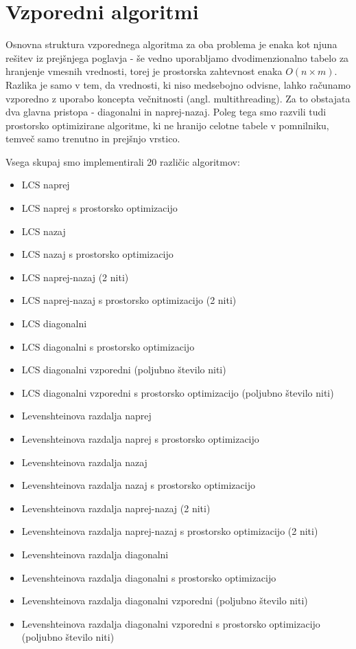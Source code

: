 \documentclass[a4paper,12pt,openright]{book}
\begin{document}
\chapter{Vzporedni algoritmi}

Osnovna struktura vzporednega algoritma za oba problema je enaka kot njuna rešitev iz prejšnjega poglavja - še vedno uporabljamo dvodimenzionalno tabelo za hranjenje vmesnih vrednosti, torej je prostorska zahtevnost enaka $O(n \times m)$. Razlika je samo v tem, da vrednosti, ki niso medsebojno odvisne, lahko računamo vzporedno z uporabo koncepta večnitnosti (angl. multithreading). Za to obstajata dva glavna pristopa - diagonalni in naprej-nazaj. Poleg tega smo razvili tudi prostorsko optimizirane algoritme, ki ne hranijo celotne tabele v pomnilniku, temveč samo trenutno in prejšnjo vrstico. 

Vsega skupaj smo implementirali 20 različic algoritmov:
\begin{itemize}
  \item LCS naprej 
  \item LCS naprej s prostorsko optimizacijo
  \item LCS nazaj 
  \item LCS nazaj s prostorsko optimizacijo
  \item LCS naprej-nazaj (2 niti)
  \item LCS naprej-nazaj s prostorsko optimizacijo (2 niti)
  \item LCS diagonalni
  \item LCS diagonalni s prostorsko optimizacijo
  \item LCS diagonalni vzporedni (poljubno število niti)
  \item LCS diagonalni vzporedni s prostorsko optimizacijo (poljubno število niti)
  \item Levenshteinova razdalja naprej 
  \item Levenshteinova razdalja naprej s prostorsko optimizacijo
  \item Levenshteinova razdalja nazaj 
  \item Levenshteinova razdalja nazaj s prostorsko optimizacijo
  \item Levenshteinova razdalja naprej-nazaj (2 niti)
  \item Levenshteinova razdalja naprej-nazaj s prostorsko optimizacijo (2 niti)
  \item Levenshteinova razdalja diagonalni
  \item Levenshteinova razdalja diagonalni s prostorsko optimizacijo
  \item Levenshteinova razdalja diagonalni vzporedni (poljubno število niti)
  \item Levenshteinova razdalja diagonalni vzporedni s prostorsko optimizacijo (poljubno število niti)
\end{itemize}
\end{document}
